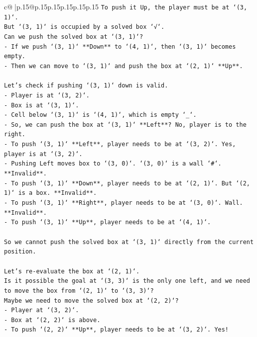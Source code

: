 \documentclass{article}
\begin{document}
{\begin{supertabular}{c@{$\;$}|p{.15\linewidth}@{}p{.15\linewidth}p{.15\linewidth}p{.15\linewidth}p{.15\linewidth}p{.15\linewidth}}
{{{\texttt{To push it Up, the player must be at `(3, 1)`.} \\
\texttt{But `(3, 1)` is occupied by a solved box `√`.} \\
\texttt{Can we push the solved box at `(3, 1)`?} \\
\texttt{{-} If we push `(3, 1)` **Down** to `(4, 1)`, then `(3, 1)` becomes empty.} \\
\texttt{{-} Then we can move to `(3, 1)` and push the box at `(2, 1)` **Up**.} \\
\\ 
\texttt{Let's check if pushing `(3, 1)` down is valid.} \\
\texttt{{-} Player is at `(3, 2)`.} \\
\texttt{{-} Box is at `(3, 1)`.} \\
\texttt{{-} Cell below `(3, 1)` is `(4, 1)`, which is empty `\_`.} \\
\texttt{{-} So, we can push the box at `(3, 1)` **Left**? No, player is to the right.} \\
\texttt{{-} To push `(3, 1)` **Left**, player needs to be at `(3, 2)`. Yes, player is at `(3, 2)`.} \\
\texttt{{-} Pushing Left moves box to `(3, 0)`. `(3, 0)` is a wall `\#`. **Invalid**.} \\
\texttt{{-} To push `(3, 1)` **Down**, player needs to be at `(2, 1)`. But `(2, 1)` is a box. **Invalid**.} \\
\texttt{{-} To push `(3, 1)` **Right**, player needs to be at `(3, 0)`. Wall. **Invalid**.} \\
\texttt{{-} To push `(3, 1)` **Up**, player needs to be at `(4, 1)`.} \\
\\ 
\texttt{So we cannot push the solved box at `(3, 1)` directly from the current position.} \\
\\ 
\texttt{Let's re{-}evaluate the box at `(2, 1)`.} \\
\texttt{Is it possible the goal at `(3, 3)` is the only one left, and we need to move the box from `(2, 1)` to `(3, 3)`?} \\
\texttt{Maybe we need to move the solved box at `(2, 2)`?} \\
\texttt{{-} Player at `(3, 2)`.} \\
\texttt{{-} Box at `(2, 2)` is above.} \\
\texttt{{-} To push `(2, 2)` **Up**, player needs to be at `(3, 2)`. Yes!} \\
}}}
\end{supertabular}}
\end{document}
